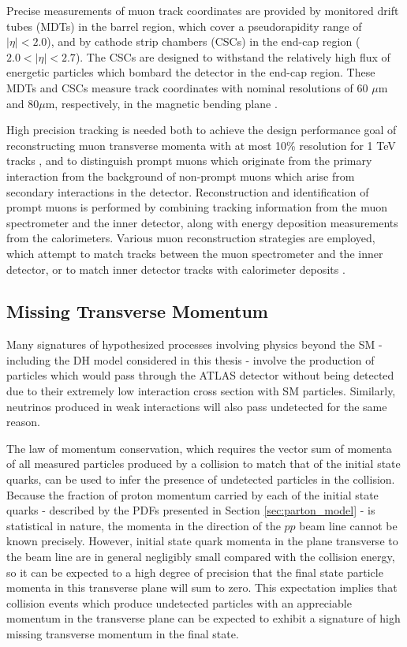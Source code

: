 Precise measurements of muon track coordinates are provided by monitored drift tubes (MDTs) in the barrel region, which cover a pseudorapidity range of \(|\eta|<2.0\)), and by cathode strip chambers (CSCs) in the end-cap region (\(2.0<|\eta|<2.7\)). The CSCs are designed to withstand the relatively high flux of energetic particles which bombard the detector in the end-cap region. These MDTs and CSCs measure track coordinates with nominal resolutions of 60 \(\mu\)m and 80\(\mu\)m, respectively, in the magnetic bending plane \cite{muon_reco}. 

High precision tracking is needed both to achieve the design performance goal of reconstructing muon transverse momenta with at most 10\% resolution for 1 TeV tracks \cite{atlas}, and to distinguish prompt muons which originate from the primary interaction from the background of non-prompt muons which arise from secondary interactions in the detector. Reconstruction and identification of prompt muons is performed by combining tracking information from the muon spectrometer and the inner detector, along with energy deposition measurements from the calorimeters. Various muon reconstruction strategies are employed, which attempt to match tracks between the muon spectrometer and the inner detector, or to match inner detector tracks with calorimeter deposits \cite{muon_reco}.

\subsection{Missing Transverse Momentum}
\label{sec:met}

Many signatures of hypothesized processes involving physics beyond the SM - including the DH model considered in this thesis - involve the production of particles which would pass through the ATLAS detector without being detected due to their extremely low interaction cross section with SM particles. Similarly, neutrinos produced in weak interactions will also pass undetected for the same reason. 

The law of momentum conservation, which requires the vector sum of momenta of all measured particles produced by a collision to match that of the initial state quarks, can be used to infer the presence of undetected particles in the collision. Because the fraction of proton momentum carried by each of the initial state quarks - described by the PDFs presented in Section \ref{sec:parton_model} - is statistical in nature, the momenta in the direction of the \(pp\) beam line cannot be known precisely. However, initial state quark momenta in the plane transverse to the beam line are in general negligibly small compared with the collision energy, so it can be expected to a high degree of precision that the final state particle momenta in this transverse plane will sum to zero. This expectation implies that collision events which produce undetected particles with an appreciable momentum in the transverse plane can be expected to exhibit a signature of high missing transverse momentum in the final state. 

